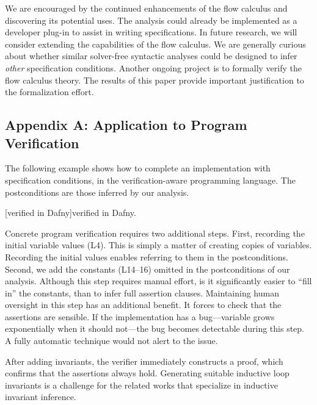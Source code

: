 We are encouraged by the continued enhancements of the flow calculus and discovering its potential uses.
The analysis could already be implemented as a developer plug-in to assist in writing specifications.
In future research, we will consider extending the capabilities of the flow calculus.
We are generally curious about whether similar solver-free syntactic analyses could be designed to infer \emph{other} specification conditions. %
Another ongoing project is to formally verify the flow calculus theory.
The results of this paper provide important justification to the formalization effort.

\clearpage

\subsection{Appendix A: Application to Program Verification}
\label{app:sec:verified}

The following example shows how to complete an implementation with specification
conditions, in the verification-aware  programming language. The
postconditions are those inferred by our analysis.

\begin{center}
\begin{minipage}{\textwidth}
\captionsetup{type=lstlisting}
[\exname verified in Dafny]{\exname verified in Dafny.}
\label{lst:dafny-ex}
\end{minipage}
\end{center}

Concrete program verification requires two additional steps. First, recording
the initial variable values (L4). This is simply a matter of creating copies of
variables. Recording the initial values enables referring to them in the
postconditions. Second, we add the constants (L14--16) omitted in the
postconditions of our analysis. Although this step requires manual effort, is it
significantly easier to \enquote{fill in} the constants, than to infer full
assertion clauses. Maintaining human oversight in this step has an additional
benefit. It forces to check that the assertions are sensible. If the
implementation has a bug---\eg variable grows exponentially when it should
not---the bug becomes detectable during this step. A fully automatic technique
would not alert to the issue.

After adding invariants, the  verifier immediately constructs a proof,
which confirms that the assertions always hold. Generating suitable inductive
loop invariants is a challenge for the related works that specialize in
inductive invariant inference.

